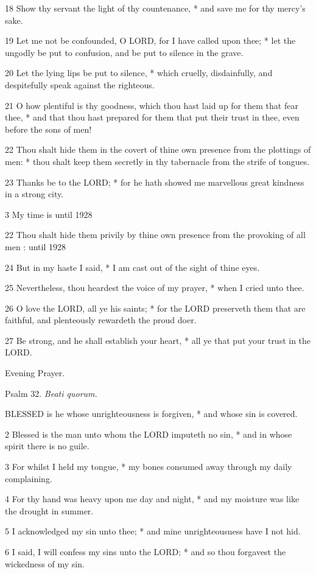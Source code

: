 18 Show thy servant the light of thy countenance, * and
save me for thy mercy's sake.

19 Let me not be confounded, O LORD,
for I have called upon thee; * let the ungodly be put to confusion, and
be put to silence in the grave.

20 Let the lying lips be put to silence, * which cruelly,
disdainfully, and despitefully speak against the righteous.

21 O how plentiful is thy goodness, which thou hast laid
up for them that fear thee, * and that thou hast prepared for them that
put their trust in thee, even before the sons of men!

22 Thou shalt hide them in the covert of thine own presence
from the plottings of men: * thou shalt keep them secretly in thy tabernacle
from the strife of tongues.

23 Thanks be to the LORD; * for
he hath showed me marvellous great kindness in a strong city.

3 My time is until
1928

22 Thou shalt hide them privily
by thine own presence from the provoking of all men : until
1928

24 But in my haste I said, * I am cast out of the sight
of thine eyes.

25 Nevertheless, thou heardest the voice of my prayer,
* when I cried unto thee.

26 O love the LORD, all ye his
saints; * for the LORD preserveth them that are
faithful, and plenteously rewardeth the proud doer.

27 Be strong, and he shall establish your heart, *
all ye that put your trust in the LORD.

Evening
Prayer.

Psalm
32. \emph{Beati quorum.}

BLESSED
is he whose unrighteousness is forgiven, * and whose sin is covered.

2 Blessed is the man unto whom the LORD
imputeth no sin, * and in whose spirit there is no guile.

3 For whilst I held my tongue, * my bones consumed
away through my daily complaining.

4 For thy hand was heavy upon me day and night, * and
my moisture was like the drought in summer.

5 I acknowledged my sin unto thee; * and mine unrighteousness
have I not hid.

6 I said, I will confess my sins unto the LORD;
* and so thou forgavest the wickedness of my sin.

